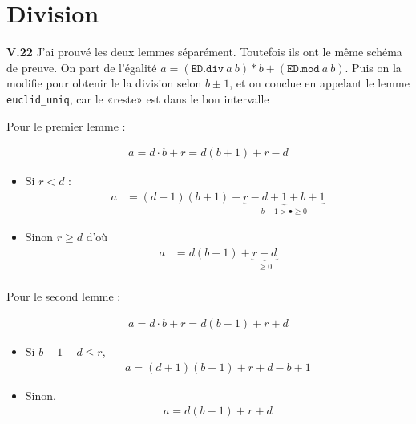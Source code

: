 \documentclass[9pt,a4paper,twocolumn]{article}
\theoremstyle{definition}
\renewcommand{\leq}{\leqslant}
\renewcommand{\geq}{\geqslant}
\newenvironment{code}[1][ocaml]{%
\newgeometry{textwidth = 0.8\textwidth}
\VerbatimEnvironment\begin{verbatim}%
}{%
\end{verbatim}
\restoregeometry
}
\begin{document}
\section{Division}

\textbf{V.22}
J'ai prouvé les deux lemmes séparément. Toutefois ils ont le même schéma de
preuve.
On part de l'égalité $a = (\texttt{ED.div}\ a\ b)*b+(\texttt{ED.mod}\ a\ b)$.
Puis on la modifie pour obtenir le la division selon $b\pm 1$, et on conclue en
appelant le lemme \texttt{euclid\_uniq}, car le «reste» est dans le bon
intervalle

Pour le premier lemme :

\begin{align*}
   a = d\cdot b+r = d(b+1) +r-d
\end{align*}

\begin{itemize}
   \item Si $r < d$ :
\begin{align*}
a   &= (d-1)(b+1) +
   \underbrace{r-d+1+b+1}_{b+1 > \bullet\geq 0}
\end{align*}
   \item Sinon $r \geq d$ d'où
\begin{align*}
a
   &= d(b+1) +
   \underbrace{r-d}_{\geq 0} \\
\end{align*}
\end{itemize}




Pour le second lemme :

\begin{align*}
a = d\cdot b +r = d(b-1) +r +d
\end{align*}

\begin{itemize}
   \item Si $b-1-d \leq r$,
   \begin{align*}
      a = (d+1)(b-1) + r + d - b + 1
   \end{align*}
   \item Sinon,
   \begin{align*}
      a = d(b-1) + r + d
   \end{align*}
\end{itemize}
\end{document}
